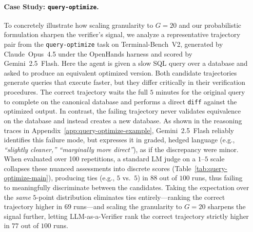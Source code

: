 \vspace{-0.15in}
\paragraph{Case Study: \texttt{query-optimize}.}
To concretely illustrate how scaling granularity to $G{=}20$ and our probabilistic formulation sharpen the verifier's signal, we analyze a representative trajectory pair from the \texttt{query-optimize} task on Terminal-Bench~V2, generated by Claude~Opus~4.5 under the OpenHands harness and scored by Gemini~2.5~Flash. Here the agent is given a slow SQL query over a database and asked to produce an equivalent optimized version. Both candidate trajectories generate queries that execute faster, but they differ critically in their verification procedures. The correct trajectory waits the full $5$ minutes for the original query to complete on the canonical database and performs a direct \texttt{diff} against the optimized output. In contrast, the failing trajectory never validates equivalence on the database and instead creates a new database. As shown in the reasoning traces in Appendix~\ref{app:query-optimize-example}, Gemini~2.5~Flash reliably identifies this failure mode, but expresses it in graded, hedged language (e.g., \textit{``slightly cleaner,''} \textit{``marginally more direct''}), as if the discrepancy were minor. When evaluated over 100 repetitions, a standard LM judge on a $1$--$5$ scale collapses these nuanced assessments into discrete scores (Table~\ref{tab:query-optimize-main}), producing ties (e.g., $5$ vs.\ $5$) in $88$ out of $100$ runs, thus failing to meaningfully discriminate between the candidates. Taking the expectation over the \emph{same} $5$-point distribution eliminates ties entirely---ranking the correct trajectory higher in $69$ runs---and scaling the granularity to $G{=}20$ sharpens the signal further, letting LLM-as-a-Verifier rank the correct trajectory strictly higher in $77$ out of $100$ runs.

